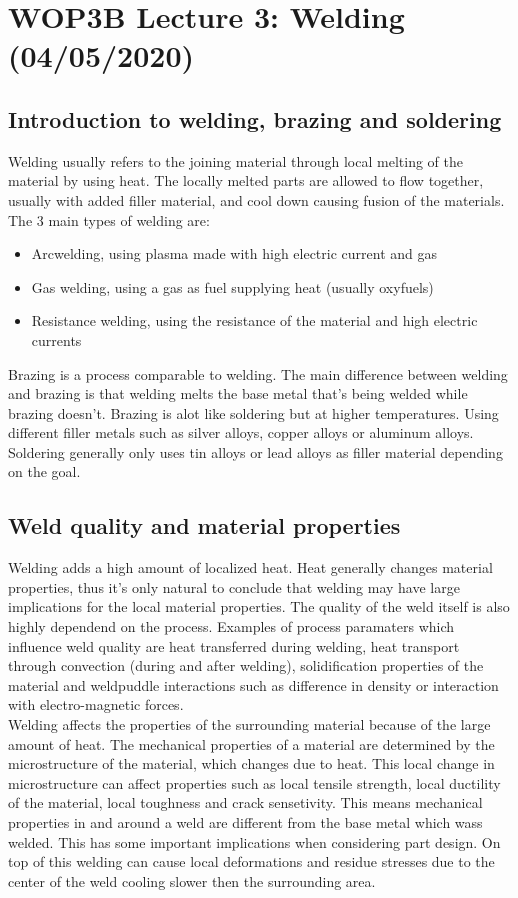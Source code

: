 \documentclass[11pt, a4paper]{article}
\begin{document}
\setcounter{equation}{0}
\setcounter{section}{2}
\section{WOP3B Lecture 3: Welding (04/05/2020)}


\subsection{Introduction to welding, brazing and soldering}
Welding usually refers to the joining material through local melting of the material by using heat. The locally melted parts are allowed to flow together, usually with added filler material, and cool down causing fusion of the materials. The 3 main types of welding are:
\begin{itemize}
  \item Arcwelding, using plasma made with high electric current and gas
  \item Gas welding, using a gas as fuel supplying heat (usually oxyfuels)
  \item Resistance welding, using the resistance of the material and high electric currents
\end{itemize}
Brazing is a process comparable to welding. The main difference between welding and brazing is that welding melts the base metal that's being welded while brazing doesn't. Brazing is alot like soldering but at higher temperatures. Using different filler metals such as silver alloys, copper alloys or aluminum alloys. Soldering generally only uses tin alloys or lead alloys as filler material depending on the goal.


\subsection{Weld quality and material properties}
Welding adds a high amount of localized heat. Heat generally changes material properties, thus it's only natural to conclude that welding may have large implications for the local material properties. The quality of the weld itself is also highly dependend on the process. Examples of process paramaters which influence weld quality are heat transferred during welding, heat transport through convection (during and after welding), solidification properties of the material and weldpuddle interactions such as difference in density or interaction with electro-magnetic forces.\\
Welding affects the properties of the surrounding material because of the large amount of heat. The mechanical properties of a material are determined by the microstructure of the material, which changes due to heat. This local change in microstructure can affect properties such as local tensile strength, local ductility of the material, local toughness and crack sensetivity. This means mechanical properties in and around a weld are different from the base metal which wass welded. This has some important implications when considering part design. On top of this welding can cause local deformations and residue stresses due to the center of the weld cooling slower then the surrounding area.
\end{document}
